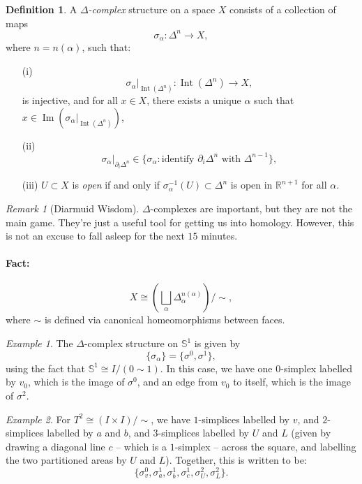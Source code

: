 \documentclass[a4paper]{report}
\theoremstyle{definition}
\newtheorem{definition}{Definition}
\theoremstyle{remark}
\newtheorem{remark}{Remark}
\theoremstyle{proposition}
\theoremstyle{conjecture}
\theoremstyle{lemma}
\theoremstyle{corollary}
\theoremstyle{exercise}
\newtheorem{example}{Example}
\newcommand{\on}{\operatorname}
\begin{document}
\begin{definition}
    A \emph{$\Delta$-complex} structure on a space $X$ consists of a collection of maps 
    $$\sigma_\alpha : \Delta^n \longrightarrow X,$$ 
    where $n = n(\alpha)$, such that:
    \begin{itemize}
        \item[(i)] $$\sigma_\alpha\vert_{\on{Int}(\Delta^n)} : \on{Int}(\Delta^n) \longrightarrow X,$$
        is injective, and for all $x \in X$, there exists a unique $\alpha$ such that 
        $x \in \on{Im}(\sigma_\alpha \vert_{\on{Int}(\Delta^n)})$,
        \item[(ii)] $$\sigma_\alpha \vert_{\partial_i\Delta^n} \in \lbrace \sigma_\alpha : \text{identify $\partial_i\Delta^n$ with $\Delta^{n-1}$}\rbrace,$$
        \item[(iii)] $U \subset X$ is \emph{open} if and only if $\sigma_\alpha^{-1}(U) \subset \Delta^n$ is open in $\mathbb{R}^{n+1}$ for all $\alpha$.
    \end{itemize}
\end{definition}

\begin{remark}[Diarmuid Wisdom]
    $\Delta$-complexes are important, but they are not the main game. They're just a useful tool for getting us into 
    homology. However, this is not an excuse to fall asleep for the next $15$ minutes.
\end{remark}

\paragraph{Fact:} $$X \cong \left(\bigsqcup_\alpha \Delta_\alpha^{n(\alpha)} \right)/ \sim,$$ 
where $\sim$ is defined via canonical homeomorphisms between faces.

\begin{example}
    The $\Delta$-complex structure on $\mathbb{S}^1$ is given by 
    $$\lbrace \sigma_\alpha \rbrace = \lbrace \sigma^0,\sigma^1\rbrace,$$
    using the fact that $\mathbb{S}^1 \cong I /(0 \sim 1)$. In this case, we have one 
    $0$-simplex labelled by $v_0$, which is the image of $\sigma^0$, and an edge 
    from $v_0$ to itself, which is the image of $\sigma^2$.
\end{example}

\begin{example}
    For $T^2 \cong (I \times I)/\sim$, we have $1$-simplices labelled by 
    $v$, and $2$-simplices labelled by $a$ and $b$, and $3$-simplices labelled by $U$ and $L$
    (given by drawing a diagonal line $c$ -- which is a $1$-simplex -- across the square, and labelling the two partitioned areas 
    by $U$ and $L$). Together, this is written to be:
    $$\lbrace \sigma_v^0, \sigma_a^1, \sigma_b^1, \sigma_c^1, \sigma_U^2, \sigma_L^2\rbrace.$$
\end{example}
\end{document}
